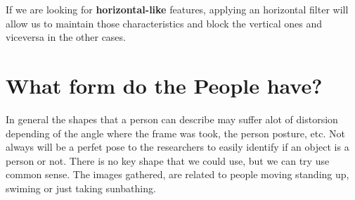 \documentclass[11pt,twoside,a4paper]{article}
\begin{document}
If we are looking for \textbf{horizontal-like} features, applying an horizontal filter will allow us to maintain those characteristics and block the vertical ones and viceversa in the other cases.


\section{What form do the People have?}

In general the shapes that a person can describe may suffer alot of distorsion depending of the angle where the frame was took, the person posture, etc. Not always will be a perfet pose to the researchers to easily identify if an object is a person or not. There is no key shape that we could use, but we can try use common sense. The images gathered, are related to people moving standing up, swiming or just taking sunbathing.
\end{document}
